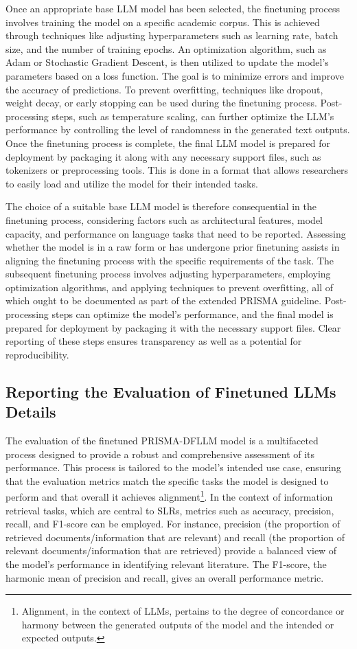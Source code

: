 \documentclass{article}
\begin{document}
Once an appropriate base LLM model has been selected, the finetuning process involves training the model on a specific academic corpus. This is achieved through techniques like adjusting hyperparameters such as learning rate, batch size, and the number of training epochs. An optimization algorithm, such as Adam or Stochastic Gradient Descent, is then utilized to update the model's parameters based on a loss function. The goal is to minimize errors and improve the accuracy of predictions. To prevent overfitting, techniques like dropout, weight decay, or early stopping can be used during the finetuning process. Post-processing steps, such as temperature scaling, can further optimize the LLM's performance by controlling the level of randomness in the generated text outputs. Once the finetuning process is complete, the final LLM model is prepared for deployment by packaging it along with any necessary support files, such as tokenizers or preprocessing tools. This is done in a format that allows researchers to easily load and utilize the model for their intended tasks.

The choice of a suitable base LLM model is therefore consequential in the finetuning process, considering factors such as architectural features, model capacity, and performance on language tasks that need to be reported. Assessing whether the model is in a raw form or has undergone prior finetuning assists in aligning the finetuning process with the specific requirements of the task. The subsequent finetuning process involves adjusting hyperparameters, employing optimization algorithms, and applying techniques to prevent overfitting, all of which ought to be documented as part of the extended PRISMA guideline. Post-processing steps can optimize the model's performance, and the final model is prepared for deployment by packaging it with the necessary support files. Clear reporting of these steps ensures transparency as well as a potential for reproducibility.


\subsection{Reporting the Evaluation of Finetuned LLMs Details}

The evaluation of the finetuned PRISMA-DFLLM model is a multifaceted process designed to provide a robust and comprehensive assessment of its performance. This process is tailored to the model's intended use case, ensuring that the evaluation metrics match the specific tasks the model is designed to perform and that overall it achieves alignment\footnote{Alignment, in the context of LLMs, pertains to the degree of concordance or harmony between the generated outputs of the model and the intended or expected outputs.}. In the context of information retrieval tasks, which are central to SLRs, metrics such as accuracy, precision, recall, and F1-score can be employed. For instance, precision (the proportion of retrieved documents/information that are relevant) and recall (the proportion of relevant documents/information that are retrieved) provide a balanced view of the model's performance in identifying relevant literature. The F1-score, the harmonic mean of precision and recall, gives an overall performance metric.
\end{document}
